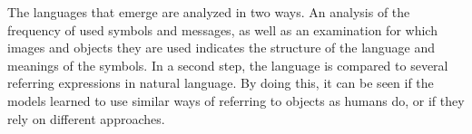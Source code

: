 The languages that emerge are analyzed in two ways.
An analysis of the frequency of used symbols and messages, as well as an examination for which images and objects they are used indicates the structure of the language and meanings of the symbols.
In a second step, the language is compared to several referring expressions in natural language.
By doing this, it can be seen if the models learned to use similar ways of referring to objects as humans do, or if they rely on different approaches.

